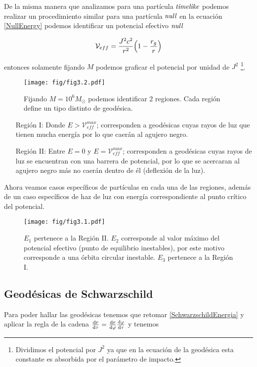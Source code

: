 \documentclass[../Main.tex]{subfiles}
\begin{document}
De la misma manera que analizamos para una partícula $\textit{timelike}$ podemos realizar un procedimiento similar para una partícula $\textit{null}$ en la ecuación \eqref{NullEnergy} podemos identificar un potencial efectivo $\textit{null}$

\begin{equation}
    \mathcal{V}_{eff} = \dfrac{J^{2}c^{2}}{r^{2}}\qty(1-\dfrac{r_{g}}{r})
\end{equation}


entonces solamente fijando $M$ podemos graficar el potencial por unidad de $J^{2}$ \footnote{Dividimos el potencial por $J^{2}$ ya que en la ecuación de la geodésica esta constante es absorbida por el parámetro de impacto.}.

\begin{figure}[H]
    \centering
    \texttt{[image: fig/fig3.2.pdf]}
    \caption{Fijando $M=10^6 M_\odot$ podemos identificar 2 regiones. Cada región define un tipo distinto de geodésica.}
    \label{potencial:regionesnull}
\end{figure}

\begin{itemize}
    \item [Región I:] Donde $E>\mathcal{V}^{max}_{eff}$; corresponden a geodésicas cuyas rayos de luz que tienen mucha energía por lo que caerán al agujero negro.
    \item [Región II:] Entre $E=0$ y $E=\mathcal{V}^{max}_{eff}$; corresponden a geodésicas cuyas rayos de luz se encuentran con una barrera de potencial, por lo que se acercaran al agujero negro más no caerán dentro de él (deflexión de la luz).
\end{itemize}

Ahora veamos casos específicos de partículas en cada una de las regiones, además de un caso específicos de haz de luz con energía correspondiente al punto crítico del potencial.

\begin{figure}[H]
    \centering
    \texttt{[image: fig/fig3.1.pdf]}
    \caption{$E_1$ pertenece a la Región II. $E_2$ corresponde al valor máximo del potencial efectivo (punto de equilibrio inestables), por este motivo corresponde a una órbita circular inestable. $E_3$ pertenece a la Región I.}
    \label{potencial:regionesnullparticles}
\end{figure}

\subsection{Geodésicas de Schwarzschild}
Para poder hallar las geodésicas tenemos que retomar \eqref{SchwarzschildEnergia} y aplicar la regla de la cadena $\dv{r}{\tau}=\dv{r}{\varphi}\dv{\varphi}{\tau}$ y tenemos 
\end{document}
